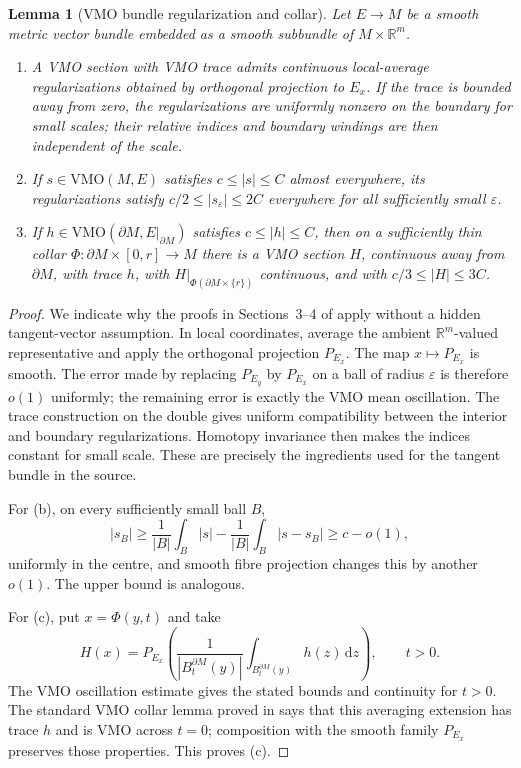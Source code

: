 \documentclass[11pt]{article}
\newtheorem{lemma}[theorem]{Lemma}
\theoremstyle{definition}
\theoremstyle{remark}
\newcommand{\VMO}{\mathrm{VMO}}
\newcommand{\dd}{\,\mathrm d}
\newcommand{\bd}{\partial}
\begin{document}
\begin{lemma}[VMO bundle regularization and collar]\label{lem:vmo}
Let $E\to M$ be a smooth metric vector bundle embedded as a smooth subbundle
of $M\times\mathbb R^m$.
\begin{enumerate}[label=\textup{(\alph*)}]
\item A VMO section with VMO trace admits continuous local-average
regularizations obtained by orthogonal projection to $E_x$.  If the trace is
bounded away from zero, the regularizations are uniformly nonzero on the
boundary for small scales; their relative indices and boundary windings are
then independent of the scale.
\item If $s\in\VMO(M,E)$ satisfies $c\le |s|\le C$ almost everywhere, its
regularizations satisfy $c/2\le |s_\varepsilon|\le 2C$ everywhere for all
sufficiently small $\varepsilon$.
\item If $h\in\VMO(\bd M,E|_{\bd M})$ satisfies
$c\le |h|\le C$, then on a sufficiently thin collar
$\Phi:\bd M\times[0,r]\to M$ there is a VMO section $H$, continuous away
from $\bd M$, with trace $h$, with $H|_{\Phi(\bd M\times\{r\})}$ continuous,
and with $c/3\le |H|\le3C$.
\end{enumerate}
\end{lemma}

\begin{proof}
We indicate why the proofs in Sections~3--4 of \cite{CSV} apply without a
hidden tangent-vector assumption.  In local coordinates, average the ambient
$\mathbb R^m$-valued representative and apply the orthogonal projection
$P_{E_x}$.  The map $x\mapsto P_{E_x}$ is smooth.  The error made by replacing
$P_{E_y}$ by $P_{E_x}$ on a ball of radius $\varepsilon$ is therefore
$o(1)$ uniformly; the remaining error is exactly the VMO mean oscillation.
The trace construction on the double gives uniform compatibility between the
interior and boundary regularizations.  Homotopy invariance then makes the
indices constant for small scale.  These are precisely the ingredients used
for the tangent bundle in the source.

For (b), on every sufficiently small ball $B$,
\[
 |s_B|\ge \frac1{|B|}\int_B|s|-\frac1{|B|}\int_B|s-s_B|
 \ge c-o(1),
\]
uniformly in the centre, and smooth fibre projection changes this by another
$o(1)$.  The upper bound is analogous.

For (c), put $x=\Phi(y,t)$ and take
\[
 H(x)=P_{E_x}\left(\frac1{|B_t^{\bd M}(y)|}
                 \int_{B_t^{\bd M}(y)}h(z)\dd z\right),\qquad t>0.
\]
The VMO oscillation estimate gives the stated bounds and continuity for
$t>0$.  The standard VMO collar lemma proved in \cite{CSV} says that this
averaging extension has trace $h$ and is VMO across $t=0$; composition with
the smooth family $P_{E_x}$ preserves those properties.  This proves (c).
\end{proof}
\end{document}

